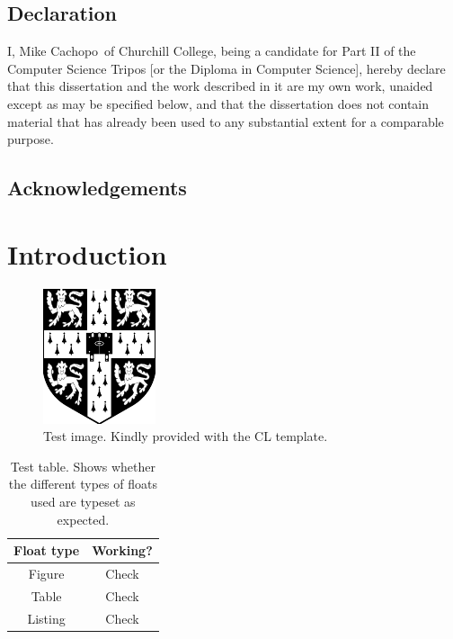 \documentclass[12pt,a4paper,twoside,openright]{report}
\newcommand{\mycaption}[2]{\caption[#1]{#1 #2}}
\newcommand{\college}{Churchill College}
\newcommand{\studentname}{Mike Cachopo}
\begin{document}
\newpage

\section*{Declaration}

I, \studentname\ of \college, being a candidate for Part II of the Computer
Science Tripos [or the Diploma in Computer Science], hereby declare
that this dissertation and the work described in it are my own work,
unaided except as may be specified below, and that the dissertation
does not contain material that has already been used to any
substantial extent for a comparable purpose.

\bigskip {}

\medskip {}

\tableofcontents

\listoffigures{}

\listoftables{}


\newpage

\section*{Acknowledgements}



\pagestyle{headings}

\chapter{Introduction}

\begin{figure}[h]
  \centering
  \includegraphics{cuarms.pdf}
  \mycaption{Test image.}{Kindly provided with the CL template.}
\end{figure}

\begin{table}[h]
  \centering
  \begin{tabular}{| c | c |}
    \hline
    Float type & Working? \\
    \hline
    Figure & Check \\
    Table & Check \\
    Listing & Check \\
    \hline
  \end{tabular}
  \mycaption{Test table.}{Shows whether the different types of floats
    used are typeset as expected.}
\end{table}
\end{document}
